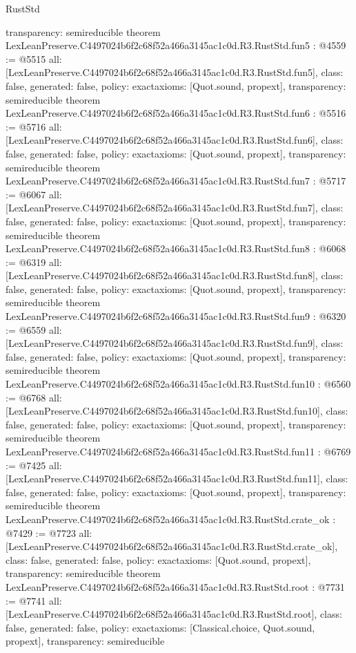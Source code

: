 \begin{lexlean}{RustStd}
\begin{coremodule}
{  transparency: semireducible
}
theorem LexLeanPreserve.C4497024b6f2c68f52a466a3145ac1c0d.R3.RustStd.fun5 : @4559 := @5515 {
  all: [LexLeanPreserve.C4497024b6f2c68f52a466a3145ac1c0d.R3.RustStd.fun5],
  class: false,
  generated: false,
  policy: exact{axioms: [Quot.sound, propext]},
  transparency: semireducible
}
theorem LexLeanPreserve.C4497024b6f2c68f52a466a3145ac1c0d.R3.RustStd.fun6 : @5516 := @5716 {
  all: [LexLeanPreserve.C4497024b6f2c68f52a466a3145ac1c0d.R3.RustStd.fun6],
  class: false,
  generated: false,
  policy: exact{axioms: [Quot.sound, propext]},
  transparency: semireducible
}
theorem LexLeanPreserve.C4497024b6f2c68f52a466a3145ac1c0d.R3.RustStd.fun7 : @5717 := @6067 {
  all: [LexLeanPreserve.C4497024b6f2c68f52a466a3145ac1c0d.R3.RustStd.fun7],
  class: false,
  generated: false,
  policy: exact{axioms: [Quot.sound, propext]},
  transparency: semireducible
}
theorem LexLeanPreserve.C4497024b6f2c68f52a466a3145ac1c0d.R3.RustStd.fun8 : @6068 := @6319 {
  all: [LexLeanPreserve.C4497024b6f2c68f52a466a3145ac1c0d.R3.RustStd.fun8],
  class: false,
  generated: false,
  policy: exact{axioms: [Quot.sound, propext]},
  transparency: semireducible
}
theorem LexLeanPreserve.C4497024b6f2c68f52a466a3145ac1c0d.R3.RustStd.fun9 : @6320 := @6559 {
  all: [LexLeanPreserve.C4497024b6f2c68f52a466a3145ac1c0d.R3.RustStd.fun9],
  class: false,
  generated: false,
  policy: exact{axioms: [Quot.sound, propext]},
  transparency: semireducible
}
theorem LexLeanPreserve.C4497024b6f2c68f52a466a3145ac1c0d.R3.RustStd.fun10 : @6560 := @6768 {
  all: [LexLeanPreserve.C4497024b6f2c68f52a466a3145ac1c0d.R3.RustStd.fun10],
  class: false,
  generated: false,
  policy: exact{axioms: [Quot.sound, propext]},
  transparency: semireducible
}
theorem LexLeanPreserve.C4497024b6f2c68f52a466a3145ac1c0d.R3.RustStd.fun11 : @6769 := @7425 {
  all: [LexLeanPreserve.C4497024b6f2c68f52a466a3145ac1c0d.R3.RustStd.fun11],
  class: false,
  generated: false,
  policy: exact{axioms: [Quot.sound, propext]},
  transparency: semireducible
}
theorem LexLeanPreserve.C4497024b6f2c68f52a466a3145ac1c0d.R3.RustStd.crate_ok : @7429 := @7723 {
  all: [LexLeanPreserve.C4497024b6f2c68f52a466a3145ac1c0d.R3.RustStd.crate_ok],
  class: false,
  generated: false,
  policy: exact{axioms: [Quot.sound, propext]},
  transparency: semireducible
}
theorem LexLeanPreserve.C4497024b6f2c68f52a466a3145ac1c0d.R3.RustStd.root : @7731 := @7741 {
  all: [LexLeanPreserve.C4497024b6f2c68f52a466a3145ac1c0d.R3.RustStd.root],
  class: false,
  generated: false,
  policy: exact{axioms: [Classical.choice, Quot.sound, propext]},
  transparency: semireducible
}


\end{coremodule}
\end{lexlean}
